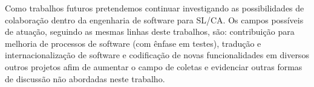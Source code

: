 Como trabalhos futuros pretendemos continuar investigando as possibilidades de colaboração dentro da engenharia de software para SL/CA. Os campos possíveis de atuação, seguindo as mesmas linhas deste trabalhos, são: contribuição para melhoria de processos de software (com ênfase em testes), tradução e internacionalização de software e codificação de novas funcionalidades em diversos outros projetos afim de aumentar o campo de coletas e evidenciar outras formas de discussão não abordadas neste trabalho.

